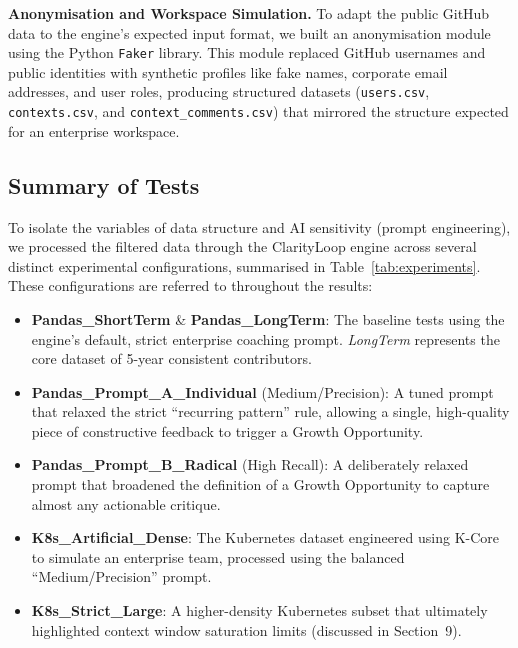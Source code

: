 \documentclass[a4paper,UKenglish,cleveref,autoref]{lipics-v2021}
\begin{document}
\textbf{Anonymisation and Workspace Simulation.}
To adapt the public GitHub data to the engine's expected input format, we built an anonymisation module using the Python \texttt{Faker} library. This module replaced GitHub usernames and public identities with synthetic profiles like fake names, corporate email addresses, and user roles, producing structured datasets (\texttt{users.csv}, \texttt{contexts.csv}, and \texttt{context\_comments.csv}) that mirrored the structure expected for an enterprise workspace.

\subsection{Summary of Tests}
To isolate the variables of data structure and AI sensitivity (prompt engineering), we processed the filtered data through the ClarityLoop engine across several distinct experimental configurations, summarised in Table~\ref{tab:experiments}. These configurations are referred to throughout the results:
\begin{itemize}
	\item \textbf{Pandas\_ShortTerm} \& \textbf{Pandas\_LongTerm}: The baseline tests using the engine's default, strict enterprise coaching prompt. \textit{LongTerm} represents the core dataset of 5-year consistent contributors.
	\item \textbf{Pandas\_Prompt\_A\_Individual} (Medium/Precision): A tuned prompt that relaxed the strict ``recurring pattern'' rule, allowing a single, high-quality piece of constructive feedback to trigger a Growth Opportunity.
	\item \textbf{Pandas\_Prompt\_B\_Radical} (High Recall): A deliberately relaxed prompt that broadened the definition of a Growth Opportunity to capture almost any actionable critique.
	\item \textbf{K8s\_Artificial\_Dense}: The Kubernetes dataset engineered using K-Core to simulate an enterprise team, processed using the balanced ``Medium/Precision'' prompt.
	\item \textbf{K8s\_Strict\_Large}: A higher-density Kubernetes subset that ultimately highlighted context window saturation limits (discussed in Section~9).
\end{itemize}
\end{document}
